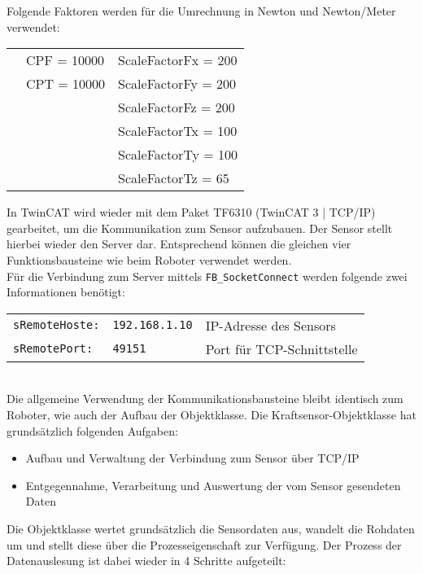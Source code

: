 		Folgende Faktoren werden für die Umrechnung in Newton und Newton/Meter verwendet: 
		
		\begin{tabularx}{\textwidth}{@{}>{}p{8em} @{}>{}p{8em} @{}>{}p{10em}}
			& CPF = 10000 		& ScaleFactorFx = 200
			\\
			& CPT = 10000 		& ScaleFactorFy = 200
			\\
			& 					& ScaleFactorFz = 200
			\\
			& 					& ScaleFactorTx = 100
			\\
			& 					& ScaleFactorTy = 100
			\\
			& 					& ScaleFactorTz = 65
			\\
		\end{tabularx}
		
		In TwinCAT wird wieder mit dem Paket TF6310 (TwinCAT 3 | TCP/IP) gearbeitet, um die Kommunikation zum Sensor aufzubauen. Der Sensor stellt hierbei wieder den Server dar. Entsprechend können die gleichen vier Funktionsbausteine wie beim Roboter verwendet werden.
		\\
		Für die Verbindung zum Server mittels \verb|FB_SocketConnect| werden folgende zwei Informationen benötigt: 
		
		\begin{tabularx}{\textwidth}{@{}>{}p{10em} @{}>{}p{8em} X@{}}
			\verb|sRemoteHoste:| 	& \verb|192.168.1.10|	& IP-Adresse des Sensors 
			\\
			\verb|sRemotePort:| 	& \verb|49151| 			& Port für TCP-Schnittstelle 
			\\
		\end{tabularx}
		\\
		
		Die allgemeine Verwendung der Kommunikationsbausteine bleibt identisch zum Roboter, wie auch der Aufbau der Objektklasse. Die Kraftsensor-Objektklasse hat grundsätzlich folgenden Aufgaben: 
		\begin{itemize}
			\item Aufbau und Verwaltung der Verbindung zum Sensor über TCP/IP
			\item Entgegennahme, Verarbeitung und Auswertung der vom Sensor gesendeten Daten
		\end{itemize}
		
		Die Objektklasse wertet grundsätzlich die Sensordaten aus, wandelt die Rohdaten um und stellt diese über die Prozesseigenschaft zur Verfügung. Der Prozess der Datenauslesung ist dabei wieder in 4 Schritte aufgeteilt: 
		
